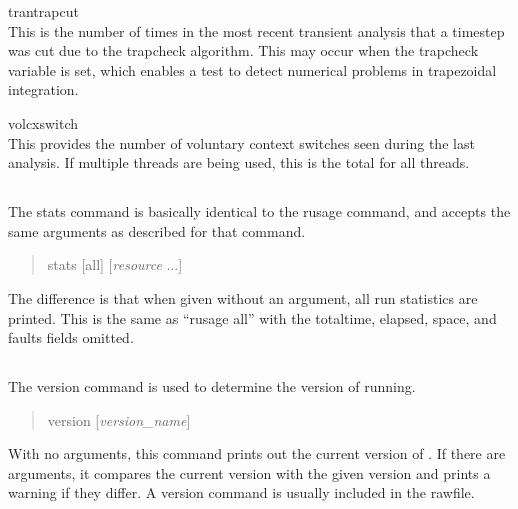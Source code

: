 \begin{description}
\item{\vt trantrapcut}\\
This is the number of times in the most recent transient analysis that
a timestep was cut due to the trapcheck algorithm.  This may occur
when the {\et trapcheck} variable is set, which enables a test to
detect numerical problems in trapezoidal integration. 

\item{\vt volcxswitch}\\
This provides the number of voluntary context switches seen during the
last analysis.  If multiple threads are being used, this is the total
for all threads.
\end{description}


\subsection{}


The {\cb stats} command is basically identical to the {\cb rusage}
command, and accepts the same arguments as described for that command.

\begin{quote}\vt
stats [all] [{\it resource\/} ...]
\end{quote}

The difference is that when given without an argument, all run statistics
are printed.  This is the same as ``{\vt rusage all}'' with the {\vt
totaltime}, {\vt elapsed}, {\vt space}, and {\vt faults} fields
omitted.


\subsection{}


The {\cb version} command is used to determine the version of {\WRspice}
running.
\begin{quote}\vt
version [{\it version\_name\/}]
\end{quote}
With no arguments, this command prints out the current version of
{\WRspice}.  If there are arguments, it compares the current version
with the given version and prints a warning if they differ.  A version
command is usually included in the rawfile.



